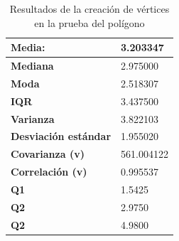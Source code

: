 \begin{table}[htp]
\centering


    
    \begin{center}
    \begin{tabular}{ | l | l | }
        
        
        \hline
        \textbf{Media: }  & 3.203347 \\
        \hline
        \textbf{Mediana} & 2.975000 \\
        \hline
        \textbf{Moda} & 2.518307 \\
        \hline
        \textbf{IQR} & 3.437500 \\
        \hline
        \textbf{Varianza} & 3.822103 \\
        \hline
        \textbf{Desviación estándar} & 1.955020 \\
        \hline
        \textbf{Covarianza (v)} & 561.004122 \\
        \hline
        \textbf{Correlación (v)} & 0.995537 \\
        \hline
        \textbf{Q1} & 1.5425 \\
        \hline
        \textbf{Q2} & 2.9750 \\
        \hline
        \textbf{Q2} & 4.9800 \\
        \hline
        
    \end{tabular} 
    \end{center}
    
    \caption{Resultados de la creación de vértices en la prueba del polígono}
    \label{tbl:results-polygon-vertices} 
\end{table}